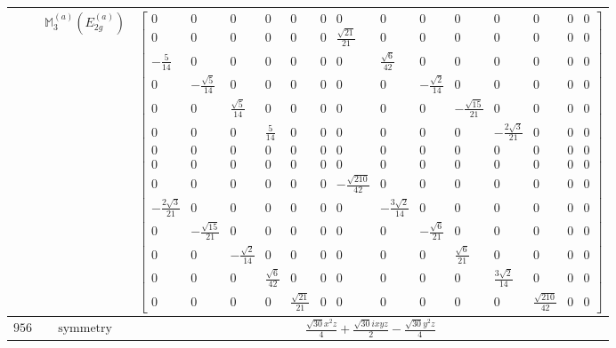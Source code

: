 \documentclass[fleqn,8pt,landscape]{jsarticle}
\begin{document}
\begin{longtable}{ccc}
$  $ & $ \mathbb{M}_{3}^{(a)}(E_{2g}^{(a)}) $ & $ \begin{bmatrix} 0 & 0 & 0 & 0 & 0 & 0 & 0 & 0 & 0 & 0 & 0 & 0 & 0 & 0 \\ 0 & 0 & 0 & 0 & 0 & 0 & \frac{\sqrt{21}}{21} & 0 & 0 & 0 & 0 & 0 & 0 & 0 \\ - \frac{5}{14} & 0 & 0 & 0 & 0 & 0 & 0 & \frac{\sqrt{6}}{42} & 0 & 0 & 0 & 0 & 0 & 0 \\ 0 & - \frac{\sqrt{5}}{14} & 0 & 0 & 0 & 0 & 0 & 0 & - \frac{\sqrt{2}}{14} & 0 & 0 & 0 & 0 & 0 \\ 0 & 0 & \frac{\sqrt{5}}{14} & 0 & 0 & 0 & 0 & 0 & 0 & - \frac{\sqrt{15}}{21} & 0 & 0 & 0 & 0 \\ 0 & 0 & 0 & \frac{5}{14} & 0 & 0 & 0 & 0 & 0 & 0 & - \frac{2 \sqrt{3}}{21} & 0 & 0 & 0 \\ 0 & 0 & 0 & 0 & 0 & 0 & 0 & 0 & 0 & 0 & 0 & 0 & 0 & 0 \\ 0 & 0 & 0 & 0 & 0 & 0 & 0 & 0 & 0 & 0 & 0 & 0 & 0 & 0 \\ 0 & 0 & 0 & 0 & 0 & 0 & - \frac{\sqrt{210}}{42} & 0 & 0 & 0 & 0 & 0 & 0 & 0 \\ - \frac{2 \sqrt{3}}{21} & 0 & 0 & 0 & 0 & 0 & 0 & - \frac{3 \sqrt{2}}{14} & 0 & 0 & 0 & 0 & 0 & 0 \\ 0 & - \frac{\sqrt{15}}{21} & 0 & 0 & 0 & 0 & 0 & 0 & - \frac{\sqrt{6}}{21} & 0 & 0 & 0 & 0 & 0 \\ 0 & 0 & - \frac{\sqrt{2}}{14} & 0 & 0 & 0 & 0 & 0 & 0 & \frac{\sqrt{6}}{21} & 0 & 0 & 0 & 0 \\ 0 & 0 & 0 & \frac{\sqrt{6}}{42} & 0 & 0 & 0 & 0 & 0 & 0 & \frac{3 \sqrt{2}}{14} & 0 & 0 & 0 \\ 0 & 0 & 0 & 0 & \frac{\sqrt{21}}{21} & 0 & 0 & 0 & 0 & 0 & 0 & \frac{\sqrt{210}}{42} & 0 & 0 \end{bmatrix} $ \\ \hline
$ 956 $ & $ \text{symmetry} $ & $ \frac{\sqrt{30} x^{2} z}{4} + \frac{\sqrt{30} i x y z}{2} - \frac{\sqrt{30} y^{2} z}{4} $ \\

\end{longtable}
\end{document}
